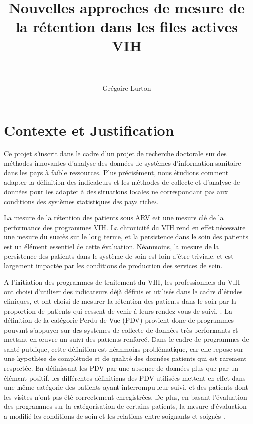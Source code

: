 \documentclass[paper=a4, fontsize=11pt]{scrartcl}
\title{
		\usefont{OT1}{bch}{b}{n}
		\normalfont \normalsize \textsc{} \\ [25pt]
		\horrule{0.5pt} \\[0.4cm]
		\huge Nouvelles approches de mesure de la rétention dans les files actives VIH \\
		\horrule{2pt} \\[0.5cm]
}
\author{
		\normalfont 								\normalsize
        Grégoire Lurton\\[-3pt]		\normalsize
}
\date{}
\numberwithin{equation}{section}		%
\numberwithin{figure}{section}			%
\numberwithin{table}{section}				%
\begin{document}
\maketitle

\section{Contexte et Justification}

Ce projet s'inscrit dans le cadre d'un projet de recherche doctorale sur des méthodes innovantes d'analyse des données de systèmes d'information sanitaire dans les pays à faible ressources. Plus précisément, nous étudions comment adapter la définition des indicateurs et les méthodes de collecte et d'analyse de données pour les adapter à des situations locales ne correspondant pas aux conditions des systèmes statistiques des pays riches.

La mesure de la rétention des patients sous ARV est une mesure clé de la performance des programmes VIH. La chronicité du VIH rend en effet nécessaire une mesure du succès sur le long terme, et la persistence dans le soin des patients est un élément essentiel de cette évaluation. Néanmoins, la mesure de la persistence des patients dans le système de soin est loin d'être triviale, et est largement impactée par les conditions de production des services de soin.

A l'initiation des programmes de traitement du VIH, les professionnels du VIH ont choisi d'utiliser des indicateurs déjà définis et utilisés dans le cadre d'études cliniques, et ont choisi de mesurer la rétention des patients dans le soin par la proportion de patients qui cessent de venir à leurs rendez-vous de suivi\cite{ioannidis_predictors_1999,lebouche_incidence_2006,moh_incidence_2007}.
. La définition de la catégorie Perdu de Vue (PDV) provient donc de programmes pouvant s'appuyer sur des systèmes de collecte de données très performants et mettant en \oe uvre un suivi des patients renforcé. Dans le cadre de programmes de santé publique, cette définition est néanmoins problématique, car elle repose sur une hypothèse de complétude et de qualité des données patients qui est rarement respectée. En définissant les PDV par une absence de données plus que par un élément positif, les différentes définitions des PDV utilisées  mettent en effet dans une même catégorie des patients ayant interrompu leur suivi, et des patients dont les visites n'ont pas été correctement enregistrées. De plus, en basant l'évaluation des programmes sur la catégorisation de certains patients, la mesure d'évaluation a modifié les conditions de soin et les relations entre soignants et soignés \cite{carillon_les_2011}.
\end{document}

